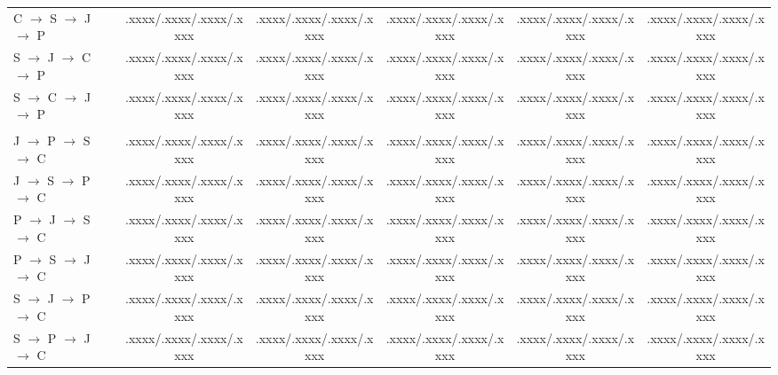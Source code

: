 \documentclass[final,5p,times,twocolumn]{elsarticle}
\theoremstyle{plain}
\begin{document}
\begin{table}[!htbp]
\begin{adjustbox}{width=0.95\textwidth}
\begin{tabular}{@{}lccccc@{}}
C $\rightarrow$ S $\rightarrow$ J $\rightarrow$ P
& .xxxx/.xxxx/.xxxx/.xxxx
& .xxxx/.xxxx/.xxxx/.xxxx
& .xxxx/.xxxx/.xxxx/.xxxx
& .xxxx/.xxxx/.xxxx/.xxxx
& .xxxx/.xxxx/.xxxx/.xxxx \\

S $\rightarrow$ J $\rightarrow$ C $\rightarrow$ P
& .xxxx/.xxxx/.xxxx/.xxxx
& .xxxx/.xxxx/.xxxx/.xxxx
& .xxxx/.xxxx/.xxxx/.xxxx
& .xxxx/.xxxx/.xxxx/.xxxx
& .xxxx/.xxxx/.xxxx/.xxxx \\

S $\rightarrow$ C $\rightarrow$ J $\rightarrow$ P
& .xxxx/.xxxx/.xxxx/.xxxx
& .xxxx/.xxxx/.xxxx/.xxxx
& .xxxx/.xxxx/.xxxx/.xxxx
& .xxxx/.xxxx/.xxxx/.xxxx
& .xxxx/.xxxx/.xxxx/.xxxx \\

\addlinespace[1pt]
\rowcolor{black!7}
\multicolumn{6}{@{}l}{\textit{Target C++ (C)}} \\

J $\rightarrow$ P $\rightarrow$ S $\rightarrow$ C
& .xxxx/.xxxx/.xxxx/.xxxx
& .xxxx/.xxxx/.xxxx/.xxxx
& .xxxx/.xxxx/.xxxx/.xxxx
& .xxxx/.xxxx/.xxxx/.xxxx
& .xxxx/.xxxx/.xxxx/.xxxx \\

J $\rightarrow$ S $\rightarrow$ P $\rightarrow$ C
& .xxxx/.xxxx/.xxxx/.xxxx
& .xxxx/.xxxx/.xxxx/.xxxx
& .xxxx/.xxxx/.xxxx/.xxxx
& .xxxx/.xxxx/.xxxx/.xxxx
& .xxxx/.xxxx/.xxxx/.xxxx \\

P $\rightarrow$ J $\rightarrow$ S $\rightarrow$ C
& .xxxx/.xxxx/.xxxx/.xxxx
& .xxxx/.xxxx/.xxxx/.xxxx
& .xxxx/.xxxx/.xxxx/.xxxx
& .xxxx/.xxxx/.xxxx/.xxxx
& .xxxx/.xxxx/.xxxx/.xxxx \\

P $\rightarrow$ S $\rightarrow$ J $\rightarrow$ C
& .xxxx/.xxxx/.xxxx/.xxxx
& .xxxx/.xxxx/.xxxx/.xxxx
& .xxxx/.xxxx/.xxxx/.xxxx
& .xxxx/.xxxx/.xxxx/.xxxx
& .xxxx/.xxxx/.xxxx/.xxxx \\

S $\rightarrow$ J $\rightarrow$ P $\rightarrow$ C
& .xxxx/.xxxx/.xxxx/.xxxx
& .xxxx/.xxxx/.xxxx/.xxxx
& .xxxx/.xxxx/.xxxx/.xxxx
& .xxxx/.xxxx/.xxxx/.xxxx
& .xxxx/.xxxx/.xxxx/.xxxx \\

S $\rightarrow$ P $\rightarrow$ J $\rightarrow$ C
& .xxxx/.xxxx/.xxxx/.xxxx
& .xxxx/.xxxx/.xxxx/.xxxx
& .xxxx/.xxxx/.xxxx/.xxxx
& .xxxx/.xxxx/.xxxx/.xxxx
& .xxxx/.xxxx/.xxxx/.xxxx \\

\bottomrule
\end{tabular}
\end{adjustbox}
\end{table}
\end{document}
